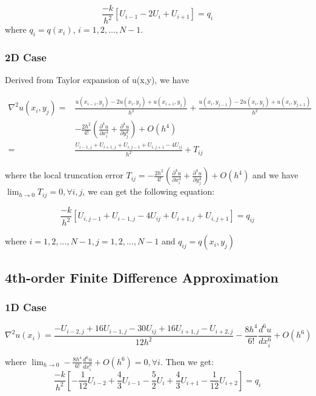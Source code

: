 \documentclass[a4paper]{article}
\begin{document}
\begin{equation}
   \frac{-k}{h^2} [U_{i-1} - 2U_{i} + U_{i+1}]   = q_{i}
\end{equation}
where $q_i = q(x_i)$,  $i = 1,2,...,N-1$.

\subsubsection{2D Case}
Derived from Taylor expansion of u(x,y), we have

\begin{equation}
    \begin{split}
    \nabla^2u(x_i, y_j) = & \frac{u(x_{i-1},y_j) - 2u(x_i,y_j) + u(x_{i+1},y_j)}{h^2} + \frac{u(x_i,y_{j-1}) - 2u(x_i,y_j) + u(x_i,y_{j+1})}{h^2} \\
    & -\frac{2h^2}{4!}(\frac{\partial^4 u}{\partial x_i^4} + \frac{\partial^4 u}{\partial y_j^4}) + O(h^4)\\ 
    = & \frac{U_{i-1,j} + U_{i+1,j} + U_{i,j-1} + U_{i,j+1} - 4U_{ij} }{h^2} + T_{ij}
    \end{split}
\end{equation}

where the local truncation error $T_{ij} = -\frac{2h^2}{4!}(\frac{\partial^4 u}{\partial x_i^4} + \frac{\partial^4 u}{\partial y_j^4}) + O(h^4)$ and we have $\lim_{h\rightarrow 0} T_{ij} = 0, \forall i,j$, we can get the following equation:

\begin{equation}
   \frac{-k}{h^2} [U_{i,j-1} + U_{i-1,j} - 4U_{ij} + U_{i+1,j} + U_{i,j+1}]   = q_{ij}
\end{equation}

where $ i = 1,2,...,N-1, j = 1,2,...,N-1$ and $q_{ij} = q(x_i,y_j)$

\subsection{4th-order Finite Difference Approximation}

\subsubsection{1D Case}
\begin{equation}
    \nabla^2 u(x_i) = \frac{-U_{i-2,j} + 16U_{i-1,j} - 30U_{ij} + 16 U_{i+1,j} - U_{i+2,j}}{12h^2} -\frac{8h^4}{6!}\frac{d^6 u}{d x_i^6}  + O(h^6)
\end{equation}

where $\lim_{h\rightarrow 0} -\frac{8h^4}{6!}\frac{d^6 u}{d x_i^6}  + O(h^6) = 0, \forall i$. Then we get:
\begin{equation}
    \frac{-k}{h^2}[ -\frac{1}{12}U_{i-2} + \frac{4}{3}U_{i-1} - \frac{5}{2}U_{i} + \frac{4}{3}U_{i+1} - \frac{1}{12}U_{i+2}] = q_{i}
\end{equation}
\end{document}

